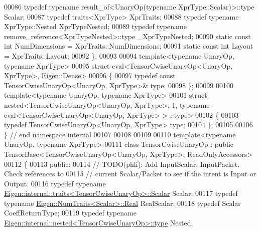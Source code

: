 \begin{DoxyCode}
00086   \textcolor{keyword}{typedef} \textcolor{keyword}{typename} result\_of<UnaryOp(typename XprType::Scalar)>::type Scalar;
00087   \textcolor{keyword}{typedef} traits<XprType> XprTraits;
00088   \textcolor{keyword}{typedef} \textcolor{keyword}{typename} XprType::Nested XprTypeNested;
00089   \textcolor{keyword}{typedef} \textcolor{keyword}{typename} remove\_reference<XprTypeNested>::type \_XprTypeNested;
00090   \textcolor{keyword}{static} \textcolor{keyword}{const} \textcolor{keywordtype}{int} NumDimensions = XprTraits::NumDimensions;
00091   \textcolor{keyword}{static} \textcolor{keyword}{const} \textcolor{keywordtype}{int} Layout = XprTraits::Layout;
00092 \};
00093 
00094 \textcolor{keyword}{template}<\textcolor{keyword}{typename} UnaryOp, \textcolor{keyword}{typename} XprType>
00095 \textcolor{keyword}{struct }eval<TensorCwiseUnaryOp<UnaryOp, XprType>, \hyperlink{namespace_eigen}{Eigen}::Dense>
00096 \{
00097   \textcolor{keyword}{typedef} \textcolor{keyword}{const} TensorCwiseUnaryOp<UnaryOp, XprType>& type;
00098 \};
00099 
00100 \textcolor{keyword}{template}<\textcolor{keyword}{typename} UnaryOp, \textcolor{keyword}{typename} XprType>
00101 \textcolor{keyword}{struct }nested<TensorCwiseUnaryOp<UnaryOp, XprType>, 1, typename eval<TensorCwiseUnaryOp<UnaryOp, XprType> >
      ::type>
00102 \{
00103   \textcolor{keyword}{typedef} TensorCwiseUnaryOp<UnaryOp, XprType> type;
00104 \};
00105 
00106 \}  \textcolor{comment}{// end namespace internal}
00107 
00108 
00109 
00110 \textcolor{keyword}{template}<\textcolor{keyword}{typename} UnaryOp, \textcolor{keyword}{typename} XprType>
00111 \textcolor{keyword}{class }TensorCwiseUnaryOp : \textcolor{keyword}{public} TensorBase<TensorCwiseUnaryOp<UnaryOp, XprType>, ReadOnlyAccessors>
00112 \{
00113   \textcolor{keyword}{public}:
00114     \textcolor{comment}{// TODO(phli): Add InputScalar, InputPacket.  Check references to}
00115     \textcolor{comment}{// current Scalar/Packet to see if the intent is Input or Output.}
00116     \textcolor{keyword}{typedef} \textcolor{keyword}{typename} \hyperlink{struct_eigen_1_1internal_1_1traits}{Eigen::internal::traits<TensorCwiseUnaryOp>::Scalar}
       Scalar;
00117     \textcolor{keyword}{typedef} \textcolor{keyword}{typename} \hyperlink{group___sparse_core___module}{Eigen::NumTraits<Scalar>::Real} RealScalar;
00118     \textcolor{keyword}{typedef} Scalar CoeffReturnType;
00119     \textcolor{keyword}{typedef} \textcolor{keyword}{typename} \hyperlink{class_eigen_1_1internal_1_1_tensor_lazy_evaluator_writable}{Eigen::internal::nested<TensorCwiseUnaryOp>::type}
       Nested;

\end{DoxyCode}
